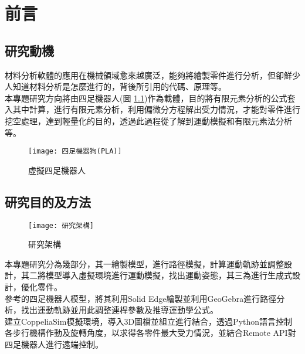 \chapter{前言}
\renewcommand{\baselinestretch}{10.0} %
\setcounter{page}{1}  %
\fontsize{14pt}{2.5pt}\sectionef

\section{研究動機}
材料分析軟體的應用在機械領域愈來越廣泛，能夠將繪製零件進行分析，但卻鮮少人知道材料分析是怎麼進行的，背後所引用的代碼、原理等。\\

本專題研究方向將由四足機器人(圖 \ref{四足機器狗(PLA)})作為載體，目的將有限元素分析的公式套入其中計算，進行有限元素分析，利用偏微分方程解出受力情況，才能對零件進行挖空處理，達到輕量化的目的，透過此過程從了解到運動模擬和有限元素法分析等。\\

\begin{figure}[hbt!]
\center
\texttt{[image: 四足機器狗(PLA)]}
\caption{\Large 虛擬四足機器人}\label{四足機器狗(PLA)}
\end{figure}
\newpage
\section{研究目的及方法}
\begin{figure}[hbt!]
\begin{center}
\texttt{[image: 研究架構]}
\caption{\Large 研究架構}\label{研究架構}
\end{center}
\end{figure}
本專題研究分為幾部分，其一繪製模型，進行路徑模擬，計算運動軌跡並調整設計，其二將模型導入虛擬環境進行運動模擬，找出運動姿態，其三為進行生成式設計，優化零件。\\

參考的四足機器人模型，將其利用Solid Edge繪製並利用GeoGebra進行路徑分析，找出運動軌跡並用此調整連桿參數及推導運動學公式。\\

建立CoppeliaSim模擬環境，導入3D圖檔並組立進行結合，透過Python語言控制各步行機構作動及旋轉角度，以求得各零件最大受力情況，並結合Remote API對四足機器人進行遠端控制。\\

